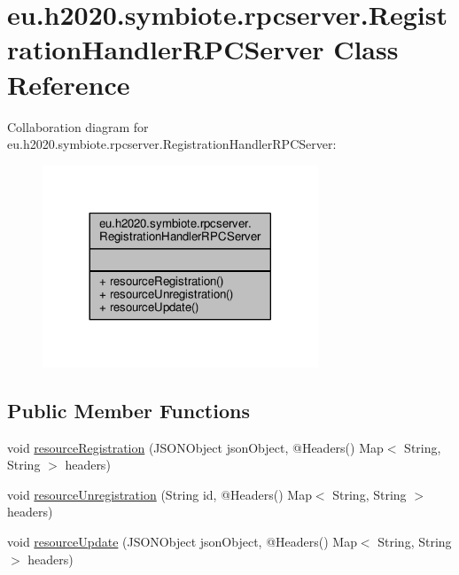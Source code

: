 \hypertarget{classeu_1_1h2020_1_1symbiote_1_1rpcserver_1_1RegistrationHandlerRPCServer}{}\section{eu.\+h2020.\+symbiote.\+rpcserver.\+Registration\+Handler\+R\+P\+C\+Server Class Reference}
\label{classeu_1_1h2020_1_1symbiote_1_1rpcserver_1_1RegistrationHandlerRPCServer}


Collaboration diagram for eu.\+h2020.\+symbiote.\+rpcserver.\+Registration\+Handler\+R\+P\+C\+Server\+:\nopagebreak
\begin{figure}[H]
\begin{center}
\leavevmode
\includegraphics[width=233pt]{classeu_1_1h2020_1_1symbiote_1_1rpcserver_1_1RegistrationHandlerRPCServer__coll__graph}
\end{center}
\end{figure}
\subsection*{Public Member Functions}
\begin{DoxyCompactItemize}
\item 
void \hyperlink{classeu_1_1h2020_1_1symbiote_1_1rpcserver_1_1RegistrationHandlerRPCServer_a59d3a42c7b9a1b51b7956226abc1d66e}{resource\+Registration} (J\+S\+O\+N\+Object json\+Object, @Headers() Map$<$ String, String $>$ headers)
\item 
void \hyperlink{classeu_1_1h2020_1_1symbiote_1_1rpcserver_1_1RegistrationHandlerRPCServer_acbb159563455460f6a3da99e5353d11a}{resource\+Unregistration} (String id, @Headers() Map$<$ String, String $>$ headers)
\item 
void \hyperlink{classeu_1_1h2020_1_1symbiote_1_1rpcserver_1_1RegistrationHandlerRPCServer_add97d8f15845030d4f09f7db65107bec}{resource\+Update} (J\+S\+O\+N\+Object json\+Object, @Headers() Map$<$ String, String $>$ headers)
\end{DoxyCompactItemize}


